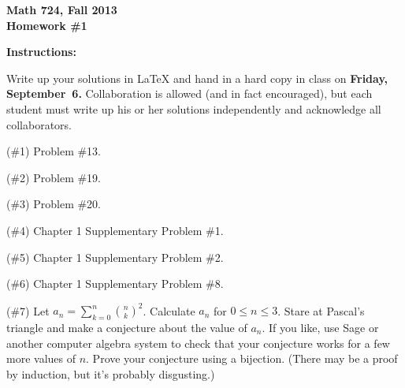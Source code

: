 
\setcounter{exprobno}{0}
\newcommand{\exprob}{\vskip10bp\addtocounter{probno}{1}{\bf(E{\arabic{probno}})}\quad}
\newcommand{\booksection}[1]{\bigskip\hrule\medskip\textbf{#1}}


{\bf Math 724, Fall 2013\\
Homework \#1

\bf Instructions:} Write up your solutions in LaTeX and hand in a hard copy in class on {\bf Friday, September~6.}  Collaboration is allowed (and in fact encouraged), but each student must write up his or her solutions independently and acknowledge all collaborators.

(\#1) Problem \#13.%

(\#2) Problem \#19.%

(\#3) Problem \#20.%

(\#4) Chapter 1 Supplementary Problem \#1.%

(\#5) Chapter 1 Supplementary Problem \#2.%

(\#6) Chapter 1 Supplementary Problem \#8.%

(\#7)
Let $a_n=\sum_{k=0}^n\binom{n}{k}^2$. Calculate $a_n$ for $0\leq n\leq 3$.  Stare at Pascal's triangle and make a conjecture about the value of $a_n$.  If you like, use Sage or another computer algebra system to check that your conjecture works for a few more values of $n$. Prove your conjecture using a bijection.  (There may be a proof by induction, but it's probably disgusting.)

